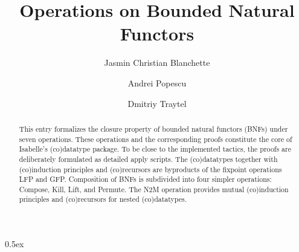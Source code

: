 \documentclass[10pt,a4paper]{article}
\begin{document}
\title{Operations on Bounded Natural Functors}
\author{Jasmin Christian Blanchette \and Andrei Popescu \and Dmitriy Traytel}

\maketitle

\begin{abstract}
\noindent
This entry formalizes the closure property of bounded natural functors (BNFs) under seven operations.
These operations and the corresponding proofs constitute the core of Isabelle's (co)datatype package.
To be close to the implemented tactics, the proofs are deliberately formulated as detailed apply scripts.
The (co)datatypes together with (co)induction principles and (co)recursors are byproducts of the fixpoint operations LFP and GFP.
Composition of BNFs is subdivided into four simpler operations: Compose, Kill, Lift, and Permute.
The N2M operation provides mutual (co)induction principles and (co)recursors for nested (co)datatypes.
\end{abstract}

\tableofcontents

\parindent 0pt\parskip 0.5ex



%
%
\end{document}
